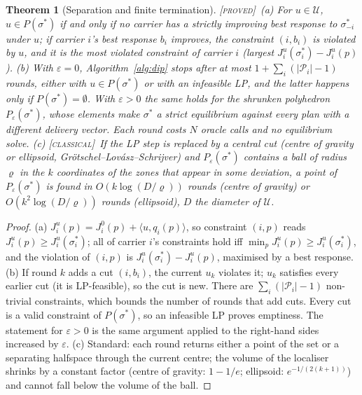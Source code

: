 \documentclass[11pt]{article}
\newtheorem{theorem}{Theorem}
\theoremstyle{definition}
\theoremstyle{remark}
\newcommand{\cP}{\mathcal{P}}
\newcommand{\cU}{\mathcal{U}}
\newcommand{\ip}[2]{\langle #1,#2\rangle}
\newcommand{\PROVED}{{\normalfont\textsc{[proved]}}}
\newcommand{\CLASSICAL}{{\normalfont\textsc{[classical]}}}
\begin{document}
\begin{theorem}[Separation and finite termination]\label{thm:cut}\PROVED\
(a) For $u\in\cU$, $u\in P(\sigma^*)$ if and only if no carrier has a strictly improving best response to $\sigma^*_{-i}$ under $u$; if carrier $i$'s best response $b_i$ improves, the constraint $(i,b_i)$ is violated by $u$, and it is the most violated constraint of carrier $i$ (largest $J^u_i(\sigma^*_i)-J^u_i(p)$).
(b) With $\varepsilon=0$, Algorithm~\ref{alg:dip} stops after at most $1+\sum_i(|\cP_i|-1)$ rounds, either with $u\in P(\sigma^*)$ or with an infeasible LP, and the latter happens only if $P(\sigma^*)=\emptyset$. With $\varepsilon>0$ the same holds for the shrunken polyhedron $P_\varepsilon(\sigma^*)$, whose elements make $\sigma^*$ a strict equilibrium against every plan with a different delivery vector. Each round costs $N$ oracle calls and no equilibrium solve.
(c) \CLASSICAL\ If the LP step is replaced by a central cut (centre of gravity or ellipsoid, Grötschel--Lovász--Schrijver) and $P_\varepsilon(\sigma^*)$ contains a ball of radius $\varrho$ in the $k$ coordinates of the zones that appear in some deviation, a point of $P_\varepsilon(\sigma^*)$ is found in $O(k\log(D/\varrho))$ rounds (centre of gravity) or $O(k^2\log(D/\varrho))$ rounds (ellipsoid), $D$ the diameter of $\cU$.
\end{theorem}
\begin{proof}
(a) $J^u_i(p)=J^0_i(p)+\ip{u}{q_i(p)}$, so constraint $(i,p)$ reads $J^u_i(p)\ge J^u_i(\sigma^*_i)$; all of carrier $i$'s constraints hold iff $\min_pJ^u_i(p)\ge J^u_i(\sigma^*_i)$, and the violation of $(i,p)$ is $J^u_i(\sigma^*_i)-J^u_i(p)$, maximised by a best response.
(b) If round $k$ adds a cut $(i,b_i)$, the current $u_k$ violates it; $u_k$ satisfies every earlier cut (it is LP-feasible), so the cut is new. There are $\sum_i(|\cP_i|-1)$ non-trivial constraints, which bounds the number of rounds that add cuts. Every cut is a valid constraint of $P(\sigma^*)$, so an infeasible LP proves emptiness. The statement for $\varepsilon>0$ is the same argument applied to the right-hand sides increased by $\varepsilon$.
(c) Standard: each round returns either a point of the set or a separating halfspace through the current centre; the volume of the localiser shrinks by a constant factor (centre of gravity: $1-1/e$; ellipsoid: $e^{-1/(2(k+1))}$) and cannot fall below the volume of the ball.
\end{proof}
\end{document}

